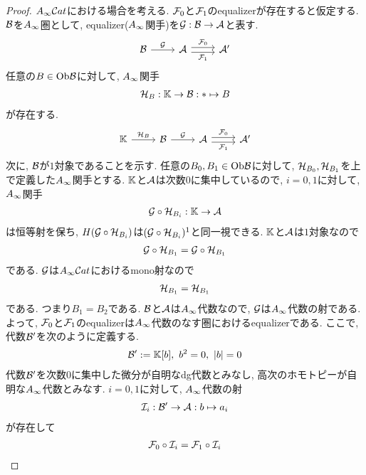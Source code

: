 \documentclass[uplatex, a4paper, 14Q, dvipdfmx]{jsarticle}
\begin{document}
\begin{proof}
  $A_{\infty}\mathcal{C} at$における場合を考える. 
  $\mathcal{F}_0$と$\mathcal{F}_1$のequalizerが存在すると仮定する. 
  $\mathcal{B}$を$A_{\infty}$圏として, equalizer($A_{\infty}$関手)を$\mathcal{G} : \mathcal{B} \to \mathcal{A}$と表す. 
  \[\begin{tikzcd}
    \B & \A & {\A'}
    \arrow["\G", from=1-1, to=1-2]
    \arrow["{\F_1}"', shift right=1, from=1-2, to=1-3]
    \arrow["{\F_0}", shift left=1, from=1-2, to=1-3]
  \end{tikzcd}\]
  任意の$B \in \mathrm{Ob}\mathcal{B}$に対して, $A_{\infty}$関手 
  \begin{align*}
    \mathcal{H}_B : \mathbb{K} \to \mathcal{B} : \ast \mapsto B
  \end{align*}
  が存在する. 
  \[\begin{tikzcd}
    \bbK & \B & \A & {\A'}
    \arrow["\G", from=1-2, to=1-3]
    \arrow["{\F_1}"', shift right=1, from=1-3, to=1-4]
    \arrow["{\F_0}", shift left=1, from=1-3, to=1-4]
    \arrow["{\H_B}", from=1-1, to=1-2]
  \end{tikzcd}\]
  次に, $\mathcal{B}$が$1$対象であることを示す. 
  任意の$B_0,B_1 \in \mathrm{Ob}\mathcal{B}$に対して, $\mathcal{H}_{B_0},\mathcal{H}_{B_1}$を上で定義した$A_{\infty}$関手とする.
  $\mathbb{K}$と$\mathcal{A}$は次数$0$に集中しているので, $i=0,1$に対して, $A_{\infty}$関手
  \begin{align*}
    \mathcal{G} \circ \mathcal{H}_{B_i} : \mathbb{K} \to \mathcal{A}
  \end{align*}
  は恒等射を保ち, $H(\mathcal{G} \circ \mathcal{H}_{B_i})$は$(\mathcal{G} \circ \mathcal{H}_{B_i})^1$と同一視できる.
  $\mathbb{K}$と$\mathcal{A}$は$1$対象なので
  \begin{align*}
    \mathcal{G} \circ \mathcal{H}_{B_1} = \mathcal{G} \circ \mathcal{H}_{B_1}
  \end{align*}
  である. 
  $\mathcal{G}$は$A_{\infty}\mathcal{C} at$におけるmono射なので
  \begin{align*}
    \mathcal{H}_{B_1} = \mathcal{H}_{B_1}
  \end{align*}
  である. 
  つまり$B_1 = B_2$である. 
  $\mathcal{B}$と$\mathcal{A}$は$A_{\infty}$代数なので, $\mathcal{G}$は$A_{\infty}$代数の射である. 
  よって, $\mathcal{F}_0$と$\mathcal{F}_1$のequalizerは$A_{\infty}$代数のなす圏におけるequalizerである. 
  ここで, 代数$\mathcal{B}'$を次のように定義する. 
  \begin{align*}
    \mathcal{B}' := \mathbb{K}[b], ~ b^2 = 0, ~ |b| = 0 
  \end{align*}
  代数$\mathcal{B}'$を次数$0$に集中した微分が自明なdg代数とみなし, 高次のホモトピーが自明な$A_{\infty}$代数とみなす.
  $i=0,1$に対して, $A_{\infty}$代数の射
  \begin{align*}
    \mathcal{I}_i : \mathcal{B}' \to \mathcal{A} : b \mapsto a_i
  \end{align*}
  が存在して 
  \begin{align*}
    \F_0 \circ \I_i = \F_1 \circ \I_i

\end{align*}
\end{proof}
\end{document}
